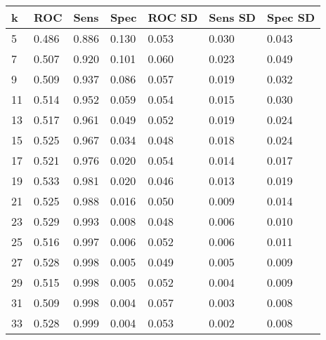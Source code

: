 {\footnotesize
	\begin{longtable}
		{l|l|l|l|l|l|l}
		\hline
		\textbf{k} & \textbf{ROC} & \textbf{Sens} & \textbf{Spec} & \textbf{ROC SD} & \textbf{Sens SD} & \textbf{Spec SD} \\ \hline
		5          & 0.486        & 0.886         & 0.130         & 0.053           & 0.030            & 0.043            \\
		7          & 0.507        & 0.920         & 0.101         & 0.060           & 0.023            & 0.049            \\
		9          & 0.509        & 0.937         & 0.086         & 0.057           & 0.019            & 0.032            \\
		11         & 0.514        & 0.952         & 0.059         & 0.054           & 0.015            & 0.030            \\
		13         & 0.517        & 0.961         & 0.049         & 0.052           & 0.019            & 0.024            \\
		15         & 0.525        & 0.967         & 0.034         & 0.048           & 0.018            & 0.024            \\
		17         & 0.521        & 0.976         & 0.020         & 0.054           & 0.014            & 0.017            \\
		19         & 0.533        & 0.981         & 0.020         & 0.046           & 0.013            & 0.019            \\
		21         & 0.525        & 0.988         & 0.016         & 0.050           & 0.009            & 0.014            \\
		23         & 0.529        & 0.993         & 0.008         & 0.048           & 0.006            & 0.010            \\
		25         & 0.516        & 0.997         & 0.006         & 0.052           & 0.006            & 0.011            \\
		27         & 0.528        & 0.998         & 0.005         & 0.049           & 0.005            & 0.009            \\
		29         & 0.515        & 0.998         & 0.005         & 0.052           & 0.004            & 0.009            \\
		31         & 0.509        & 0.998         & 0.004         & 0.057           & 0.003            & 0.008            \\
		33         & 0.528        & 0.999         & 0.004         & 0.053           & 0.002            & 0.008            \\

\end{longtable}}
